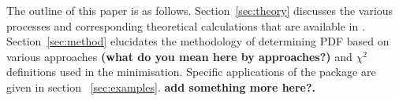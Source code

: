 %

The outline of this paper is as follows.
%
Section~\ref{sec:theory} discusses the various processes 
and corresponding theoretical calculations 
that are available in \fitter.
%
Section~\ref{sec:method} elucidates the 
methodology of determining PDF based on various approaches {\bf (what do you mean here
by approaches?)} and $\chi^2$ definitions used in the
minimisation.
%
Specific applications of the package are given in
section ~\ref{sec:examples}. 
%
{\bf add something more here?.}
